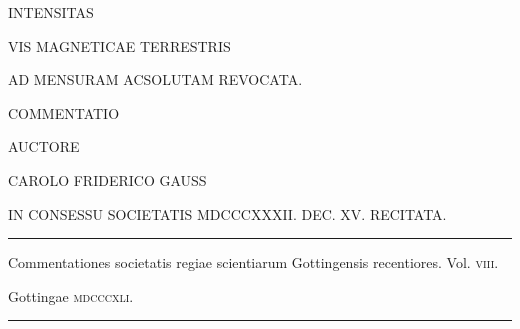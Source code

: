 \clearpage
\thispagestyle{empty}
\begin{center}
\vspace*{.6in}
{\large INTENSITAS\par}
\bigskip
{\Large VIS MAGNETICAE TERRESTRIS\par}
\bigskip
{\large AD MENSURAM ACSOLUTAM REVOCATA.\par}
\vspace{.4in}
COMMENTATIO\par
\vspace{.4in}
{\small AUCTORE\par}
\bigskip
CAROLO FRIDERICO GAUSS\par
\bigskip
{\small IN CONSESSU SOCIETATIS MDCCCXXXII. DEC. XV. RECITATA.\par}
\vfill
\rule{.8\textwidth}{.3pt}\par
\medskip
{\small Commentationes societatis regiae scientiarum Gottingensis recentiores. Vol. \textsc{viii}.\par}
Gottingae \textsc{mdcccxli}.\par
\medskip
\rule{.8\textwidth}{.3pt}\par
\end{center}
\clearpage
